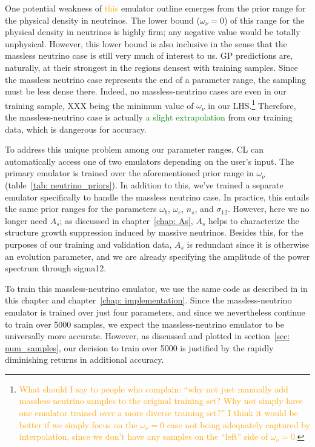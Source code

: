 One potential weakness of \textcolor{orange}{this} emulator outline emerges 
from the prior range for the physical density in neutrinos. The lower bound 
($\omega_\nu = 0$) of this range for the physical density in neutrinos is 
highly firm; any negative value would be totally unphysical. However, this 
lower bound is also inclusive in the sense that the massless neutrino case is 
still very much of interest to us. GP predictions are, naturally, at their 
strongest in the regions densest with training samples. Since the massless 
neutrino case represents the end of a parameter range, the sampling must be 
less dense there. Indeed, no massless-neutrino cases are even in our training 
sample, XXX being the minimum value of $\omega_\nu$ in our 
LHS.\footnote{\textcolor{orange}{What should I say to people who complain: 
``why not just manually add massless-neutrino samples to the original training 
set? Why not simply have one emulator trained over a more diverse training 
set?'' I think it would be better if we simply focus on the $\omega_\nu = 0$
case not being adequately captured by interpolation, since we don't have any
samples on the ``left'' side of $\omega_\nu = 0$.}}
Therefore, the massless-neutrino case is actually \textcolor{green}{a slight
extrapolation} from our training data, which is dangerous for accuracy.

To 
address this unique problem among our parameter ranges, CL can automatically 
access one of two emulators depending on the user’s input. The primary 
emulator is trained over the aforementioned prior range in $\omega_\nu$
(table~\ref{tab: neutrino_priors}). In addition to this, we’ve trained a 
separate emulator specifically to handle the massless neutrino case. In 
practice, this entails the same prior ranges for the parameters $\omega_b$, 
$\omega_c$, $n_s$, and $\sigma_{12}$. However, here we no longer need $A_s$;
as discussed in chapter~\ref{chap: As}, $A_s$ helps to characterize the
structure growth suppression induced by massive neutrinos. Besides this, for 
the purposes of our training and validation data, $A_s$ is redundant since it
is otherwise an evolution parameter, and we are already specifying the 
amplitude of the power spectrum through sigma12. 

To train this massless-neutrino emulator, we use the same code as described in 
in this chapter and chapter~\ref{chap: implementation}. Since the
massless-neutrino emulator is trained over just four parameters, and since we 
nevertheless continue to train over 5000 samples, we expect the
massless-neutrino emulator to be universally more accurate. However, as
discussed and plotted in section~\ref{sec: num_samples}, our decision to train 
over 5000 is justified by the rapidly diminishing returns in additional 
accuracy.

